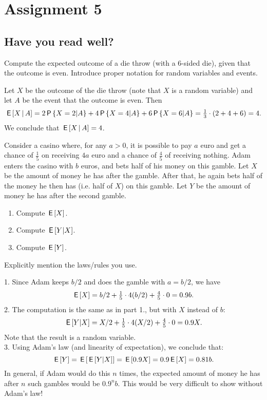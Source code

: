 \documentclass[assignments]{subfiles}
\begin{document}
\section{Assignment 5}

\subsection{Have you read well?}

\begin{exercise}
Compute the expected outcome of a die throw (with a 6-sided die), given that the outcome is even. Introduce proper notation for random variables and events.
\begin{solution}
Let $X$ be the outcome of the die throw (note that $X$ is a random variable) and let $A$ be the event that the outcome is even. Then
\begin{equation*}
\,\mathsf{E}\left[X\,\middle|\, A\right] = 2 \,\mathsf{P}\left\{X=2|A\right\} + 4 \,\mathsf{P}\left\{X=4|A\right\} + 6 \,\mathsf{P}\left\{X=6|A\right\} = \tfrac13 \cdot (2+4+6)  = 4.
\end{equation*}
We conclude that $\,\mathsf{E}\left[X\,\middle|\, A\right] = 4$.
\end{solution}
\end{exercise}


\begin{exercise}
Consider a casino where, for any $a>0$, it is possible to pay $a$ euro and get a chance of $\tfrac15$ on receiving $4a$ euro and a chance of $\tfrac45$ of receiving nothing.
Adam enters the casino with $b$ euros, and bets half of his money on this gamble.
Let $X$ be the amount of money he has after the gamble.
After that, he again bets half of the money he then has (i.e.
half of $X$) on this gamble.
Let $Y$ be the amount of money he has after the second gamble.
\begin{enumerate}
\item Compute $\,\mathsf{E}\left[X\right]$.
\item Compute $\,\mathsf{E}\left[Y|X\right]$.
\item Compute $\,\mathsf{E}\left[Y\right]$.
\end{enumerate}
Explicitly mention the laws/rules you use.
\begin{solution}

1. Since Adam keeps $b/2$ and does the gamble with $a = b/2$, we have
\begin{equation*}
\,\mathsf{E}\left[X\right] = b/2 + \tfrac15 \cdot 4(b/2) + \tfrac45 \cdot 0 = 0.9 b.
\end{equation*}
2. The computation is the same as in part 1., but with $X$ instead of $b$:
\begin{equation*}
\,\mathsf{E}\left[Y|X\right] = X/2 + \tfrac15 \cdot 4(X/2) + \tfrac45 \cdot 0 = 0.9 X.
\end{equation*}
Note that the result is a random variable. \\
3. Using Adam's law (and linearity of expectation), we conclude that:
\begin{equation*}
\,\mathsf{E}\left[Y\right] = \,\mathsf{E}\left[\,\mathsf{E}\left[Y|X\right]\right] = \,\mathsf{E}\left[0.9X\right] = 0.9\,\mathsf{E}\left[X\right] = 0.81b.
\end{equation*}
In general, if Adam would do this $n$ times, the expected amount of money he has after $n$ such gambles would be $0.9^n b$. This would be very difficult to show without Adam's law!
\end{solution}
\end{exercise}
\end{document}
